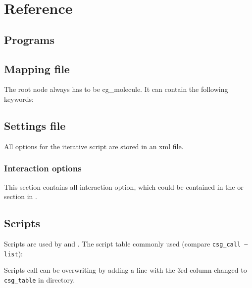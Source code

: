 \chapter{Reference}
\section{Programs}

\section{Mapping file}
\label{sec:ref_mapping}
The root node always has to be cg\_molecule. It can contain the following keywords:



\section{Settings file}
All options for the iterative script are stored in an xml file.
\label{sec:ref_options}


\subsection{Interaction options}
\label{sec:ref_interaction}
This section contains all interaction option, which could be contained in the  or  section in .

\vfill

\section{Scripts}
\label{sec:csg_table}
Scripts are used by  and .
The script table commonly used (compare \texttt{csg\_call --list}): 

Scripts call can be overwriting by adding a line with the 3rd column changed to \texttt{csg\_table} in  directory.

